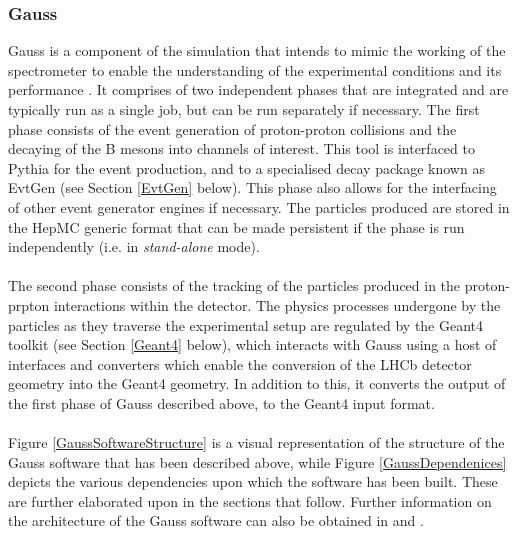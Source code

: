 \subsubsection{Gauss}
Gauss is a component of the simulation that intends to mimic the working of the spectrometer to enable the understanding of the experimental conditions and its performance \cite{Tlustos:913827}.
It comprises of two independent phases that are integrated and are typically run as a single job, but can be run separately if necessary. The first phase consists of the event generation
of proton-proton collisions and the decaying of the B mesons into channels of interest. This tool is interfaced to Pythia for the event production, and to a specialised decay package known as
EvtGen (see Section \ref{EvtGen} below). This phase also allows for the interfacing of other event generator engines if necessary. The particles produced are stored in the HepMC \cite{BUCKLEY2021107310} generic format that can be made persistent if the 
phase is run independently (i.e. in \textit{stand-alone} mode).\\
\\
The second phase consists of the tracking of the particles produced in the proton-prpton interactions within the detector. The physics processes undergone by the particles as they traverse the experimental setup are
regulated by the Geant4 toolkit (see Section \ref{Geant4} below), which interacts with Gauss using a host of interfaces and converters which enable the conversion of the LHCb detector geometry into the Geant4 geometry. In addition to this, it converts the output of the first phase of Gauss described above, to the Geant4 input format.\\
\\
Figure \ref{GaussSoftwareStructure} is a visual representation of the structure of the Gauss software that has been described above, while Figure \ref{GaussDependenices} depicts the various dependencies upon which the software has been built. These are further elaborated upon in the sections that follow. Further information on the architecture of the
Gauss software can also be obtained in \cite{Tlustos:913827} and \cite{Belyaev_2011}.
